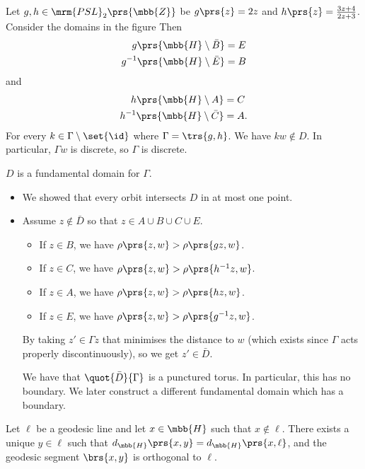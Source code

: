 \documentclass[10pt, twoside]{book}
\begin{document}
\begin{example}
Let $g,h \in \mrm{PSL}_2\prs{\mbb{Z}}$ be $g\prs{z} = 2z$ and $h\prs{z} = \frac{3z + 4}{2z + 3}$.
Consider the domains in the figure %
Then
\begin{align*}
g\prs{\mbb{H} \setminus \bar{B}} &= E \\
g^{-1}\prs{\mbb{H} \setminus \bar{E}} &= B
\end{align*}
and
\begin{align*}
h\prs{\mbb{H} \setminus A} &= C \\
h^{-1}\prs{\mbb{H} \setminus \bar{C}} &= A \text{.}
\end{align*}
For every $k \in \Gamma \setminus \set{\id}$ where $\Gamma = \trs{g,h}$. We have $kw \notin D$.
In particular, $\Gamma w$ is discrete, so $\Gamma$ is discrete.

$D$ is a fundamental domain for $\Gamma$.
\begin{itemize}
\item We showed that every orbit intersects $D$ in at most one point.
\item Assume $z \notin \bar{D}$ so that $z \in A \cup B \cup C \cup E$.
\begin{itemize}
\item If $z \in B$, we have $\rho\prs{z,w} > \rho\prs{gz, w}$.
\item If $z \in C$, we have $\rho\prs{z,w} > \rho\prs{h^{-1} z, w}$.
\item If $z \in A$, we have $\rho\prs{z,w} > \rho\prs{hz, w}$.
\item If $z \in E$, we have $\rho\prs{z,w} > \rho\prs{g^{-1}z, w}$.
\end{itemize}
By taking $z' \in \Gamma z$ that minimises the distance to $w$ (which exists since $\Gamma$ acts properly discontinuously), so we get $z' \in \bar{D}$.

We have that $\quot{\bar{D}}{\Gamma}$ is a punctured torus. In particular, this has no boundary. We later construct a different fundamental domain which has a boundary.
\end{itemize}
\end{example}

\begin{proposition}
Let $\ell$ be a geodesic line and let $x \in \mbb{H}$ such that $x \notin \ell$. There exists a unique $y \in \ell$ such that $d_{\mbb{H}}\prs{x,y} = d_{\mbb{H}}\prs{x,\ell}$, and the geodesic segment $\brs{x,y}$ is orthogonal to $\ell$.
\end{proposition}
\end{document}
